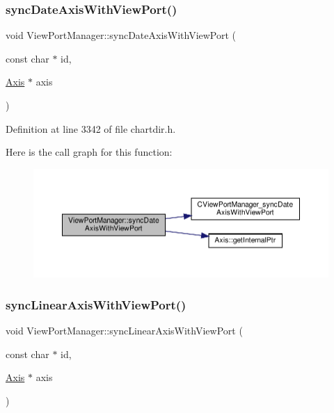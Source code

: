 \subsubsection{\texorpdfstring{sync\+Date\+Axis\+With\+View\+Port()}{syncDateAxisWithViewPort()}}
{\footnotesize\ttfamily void View\+Port\+Manager\+::sync\+Date\+Axis\+With\+View\+Port (\begin{DoxyParamCaption}\item[{const char $\ast$}]{id,  }\item[{\hyperlink{class_axis}{Axis} $\ast$}]{axis }\end{DoxyParamCaption})\hspace{0.3cm}{\ttfamily [inline]}}



Definition at line 3342 of file chartdir.\+h.

Here is the call graph for this function\+:
\nopagebreak
\begin{figure}[H]
\begin{center}
\leavevmode
\includegraphics[width=350pt]{class_view_port_manager_a7fe758aa316bfaee4bcbc9f28de8c3f0_cgraph}
\end{center}
\end{figure}
\mbox{\label{class_view_port_manager_a0c127c218b1dabc082644d5cc95f256d}} 
\subsubsection{\texorpdfstring{sync\+Linear\+Axis\+With\+View\+Port()}{syncLinearAxisWithViewPort()}}
{\footnotesize\ttfamily void View\+Port\+Manager\+::sync\+Linear\+Axis\+With\+View\+Port (\begin{DoxyParamCaption}\item[{const char $\ast$}]{id,  }\item[{\hyperlink{class_axis}{Axis} $\ast$}]{axis }\end{DoxyParamCaption})\hspace{0.3cm}{\ttfamily [inline]}}



